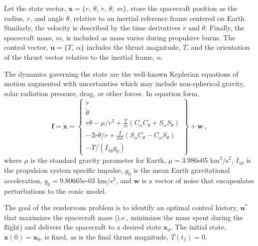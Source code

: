 \documentclass[a4paper]{article}
\renewcommand\vec{\mathbf}	%
\begin{document}


Let the state vector, $\vec{x} = \{r,~ \theta,~ \dot{r},~ \dot{\theta},~ m\}$, store the spacecraft position as the radius, $r$, and angle $\theta$, relative to an inertial reference frame centered on Earth. Similarly, the velocity is described by the time derivatives $\dot{r}$ and $\dot{\theta}$. Finally, the spacecraft mass, $m$, is included as mass varies during propulsive burns. The control vector, $\vec{u} = \{T,~ \alpha \}$ includes the thrust magnitude, $T$, and the orientation of the thrust vector relative to the inertial frame, $\alpha$.

The dynamics governing the state are the well-known Keplerian equations of motion augmented with uncertainties which may include non-spherical gravity, solar radiation pressure, drag, or other forces. In equation form,
\begin{equation}
	\vec{f} = \dot{\vec{x}} = 
    \begin{Bmatrix}
    	\dot{r}\\
        \dot{\theta}\\
        r \dot{\theta} - \mu/r^2 + \frac{T}{m} \left(C_{\alpha}C_{\theta} + S_{\alpha}S_{\theta}\right)\\
        -2\dot{r}\dot{\theta}/r + \frac{T}{mr} \left( S_{\alpha} C_{\theta} - C_{\alpha}S_{\theta} \right)\\
        -T/(I_{sp} g_0)
    \end{Bmatrix} + \vec{w}\,,
\end{equation}
where $\mu$ is the standard gravity parameter for Earth, $\mu = 3.986$e05 km$^3$/s$^2$, $I_{sp}$ is the propulsion system specific impulse, $g_0$ is the mean Earth gravitational acceleration, $g_0 = 9.80665$e-03 km/s$^2$, and $\vec{w}$ is a vector of noise that encapsulates perturbations to the conic model.

The goal of the rendezvous problem is to identify an optimal control history, $\vec{u}^*$ that maximizes the spacecraft mass (i.e., minimizes the mass spent during the flight) and delivers the spacecraft to a desired state $\vec{x}_d$. The initial state, $\vec{x}(0) = \vec{x}_0$, is fixed, as is the final thrust magnitude, $T(t_f) = 0$.
\end{document}
